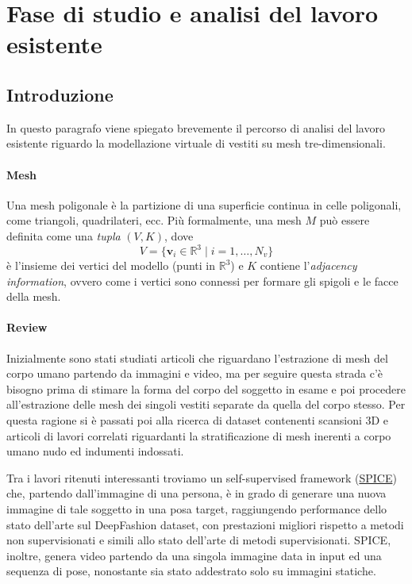 \section{Fase di studio e analisi del lavoro esistente}
\subsection{Introduzione}

In questo paragrafo viene spiegato brevemente il percorso di analisi del lavoro esistente riguardo la modellazione virtuale di vestiti su mesh tre-dimensionali.

\paragraph{Mesh}
Una mesh poligonale è la partizione di una superficie continua in celle poligonali, come triangoli, quadrilateri, ecc.
Più formalmente, una mesh \( M \) può essere definita come una \emph{tupla} \( (V, K) \), dove 
\[
V = \{ \mathbf{v}_i \in \mathbb{R}^3 \mid i = 1, \ldots, N_v \}
\]
è l'insieme dei vertici del modello (punti in \( \mathbb{R}^3 \)) e \( K \) contiene l'\emph{adjacency information}, ovvero come i vertici sono connessi per formare gli spigoli e le facce della mesh.

\paragraph{Review}
Inizialmente sono stati studiati articoli che riguardano l’estrazione di mesh del corpo umano partendo da immagini e video, ma per seguire questa strada c’è bisogno prima di stimare la forma del corpo del soggetto in esame e poi procedere all’estrazione delle mesh dei singoli vestiti separate da quella del corpo stesso. Per questa ragione si è passati poi alla ricerca di dataset contenenti scansioni 3D e articoli di lavori correlati riguardanti la stratificazione di mesh inerenti a corpo umano nudo ed indumenti indossati.

Tra i lavori ritenuti interessanti troviamo un self-supervised framework (\href{https://openaccess.thecvf.com/content/ICCV2021/papers/Sanyal_Learning_Realistic_Human_Reposing_Using_Cyclic_Self-Supervision_With_3D_Shape_ICCV_2021_paper.pdf}{SPICE}) \cite{sanyal2021learning} che, partendo dall’immagine di una persona, è in grado di generare una nuova immagine di tale soggetto in una posa target, raggiungendo performance dello stato dell’arte sul DeepFashion dataset, con prestazioni migliori rispetto a metodi non supervisionati e simili allo stato dell’arte di metodi supervisionati. SPICE, inoltre, genera video partendo da una singola immagine data in input ed una sequenza di pose, nonostante sia stato addestrato solo su immagini statiche.

